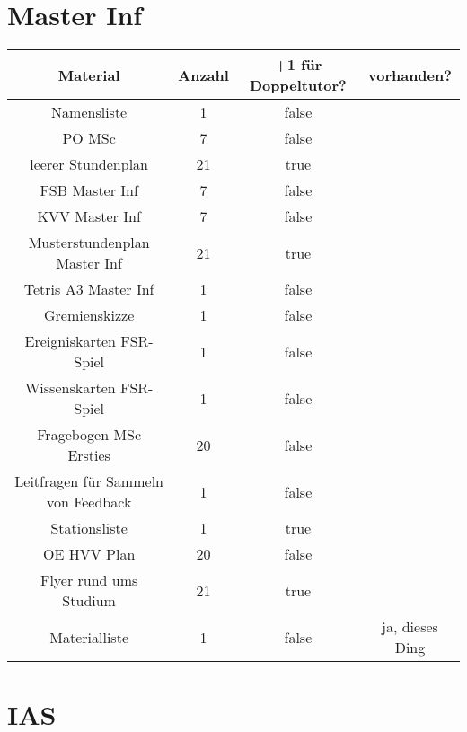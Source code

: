 \documentclass[10pt,a4paper,oneside,ngerman,numbers=noenddot]{scrartcl}
\begin{document}
\section{Master Inf}

	\begin{tabular}{c|c|c|c}
		\textbf{Material} & \textbf{Anzahl} & \textbf{+1 für Doppeltutor?} & \textbf{vorhanden?} \\
		\hline
		Namensliste & 1 & false & \\
		\hline
		PO MSc & 7 & false & \\
		\hline
		leerer Stundenplan & 21 & true & \\
		\hline
		FSB Master Inf & 7 & false & \\
		\hline
		KVV Master Inf & 7 & false & \\
		\hline
		Musterstundenplan Master Inf & 21 & true & \\
		\hline
		Tetris A3 Master Inf & 1 & false & \\
		\hline
		Gremienskizze & 1 & false & \\
		\hline
		Ereigniskarten FSR-Spiel & 1 & false & \\
		\hline
		Wissenskarten FSR-Spiel & 1 & false & \\
		\hline
		Fragebogen MSc Ersties & 20 & false & \\
		\hline
		Leitfragen für Sammeln von Feedback & 1 & false & \\
		\hline
		Stationsliste & 1 & true & \\
		\hline
		OE HVV Plan & 20 & false & \\
		\hline
		Flyer rund ums Studium & 21 & true & \\
		\hline
		Materialliste & 1 & false & ja, dieses Ding \\
	\end{tabular}

\section{IAS}
\end{document}
